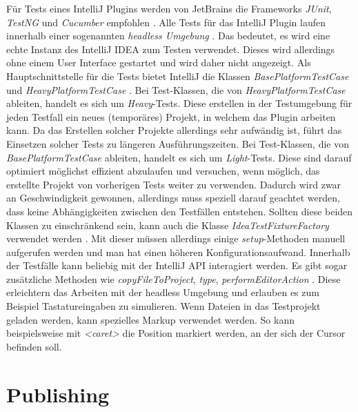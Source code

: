Für Tests eines IntelliJ Plugins werden von JetBrains 
die Frameworks \emph{JUnit}, \emph{TestNG} und \emph{Cucumber} empfohlen
\cite{IntelliJPlatformSDKTestsAndFixtures}. 
Alle Tests für das IntelliJ Plugin laufen innerhalb einer sogenannten
\emph{headless Umgebung} \cite{IntelliJPlatformSDKTestingOverview}. 
Das bedeutet, es wird eine echte Instanz
des IntelliJ IDEA zum Testen verwendet. Dieses wird allerdings ohne einem
User Interface gestartet und wird daher nicht angezeigt.
Als Hauptschnittstelle für die Tests bietet IntelliJ die Klassen
\emph{BasePlatformTestCase} und \emph{HeavyPlatformTestCase}
\cite{IntelliJPlatformSDKLightAndHeavyTests}.
Bei Test-Klassen, die von \emph{HeavyPlatformTestCase} ableiten,
handelt es sich um \emph{Heavy}-Tests. Diese erstellen in
der Testumgebung für jeden Testfall ein neues (temporäres)
Projekt, in welchem das Plugin arbeiten kann. Da das Erstellen solcher
Projekte allerdings sehr aufwändig ist, führt das Einsetzen solcher
Tests zu längeren Ausführungszeiten.
Bei Test-Klassen, die von \emph{BasePlatformTestCase} ableiten,
handelt es sich um \emph{Light}-Tests. Diese sind darauf optimiert
möglichst effizient abzulaufen und versuchen, wenn möglich, das 
erstellte Projekt von vorherigen Tests weiter zu verwenden.
Dadurch wird zwar an Geschwindigkeit gewonnen, allerdings
muss speziell darauf geachtet werden, dass keine Abhängigkeiten zwischen
den Testfällen entstehen.
Sollten diese beiden Klassen zu einschränkend sein, kann auch die
Klasse \emph{IdeaTestFixtureFactory} verwendet werden
\cite{IntelliJPlatformSDKTestsAndFixtures}. Mit dieser
müssen allerdings einige \emph{setup}-Methoden manuell aufgerufen
werden und man hat einen höheren Konfigurationsaufwand.
Innerhalb der Testfälle kann beliebig mit der IntelliJ API interagiert
werden. Es gibt sogar zusätzliche Methoden wie \emph{copyFileToProject},
\emph{type}, \emph{performEditorAction}
\cite{IntelliJPlatformSDKTestProjectAndTestdataDirectories,IntelliJPlatformSDKWritingTests}. 
Diese erleichtern das Arbeiten mit der headless Umgebung 
und erlauben es zum Beispiel Tastatureingaben zu simulieren.
Wenn Dateien in das Testprojekt geladen werden, kann spezielles Markup
verwendet werden. So kann beispielsweise mit \emph{<caret>} die Position
markiert werden, an der sich der Cursor befinden soll.

\section{Publishing}
\label{sec:EntwicklungIntelliJ_Publishing}

